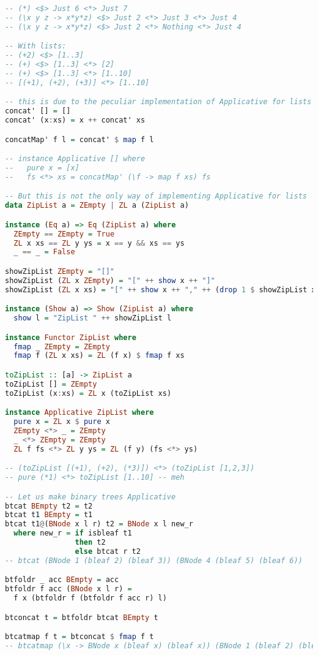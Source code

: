 \begin{lstlisting}[language=Haskell]
-- (*) <$> Just 6 <*> Just 7
-- (\x y z -> x*y*z) <$> Just 2 <*> Just 3 <*> Just 4
-- (\x y z -> x*y*z) <$> Just 2 <*> Nothing <*> Just 4

-- With lists:
-- (+2) <$> [1..3]
-- (+) <$> [1..3] <*> [2]
-- (+) <$> [1..3] <*> [1..10]
-- [(+1), (+2), (+3)] <*> [1..10]

-- this is due to the peculiar implementation of Applicative for lists
concat' [] = []
concat' (x:xs) = x ++ concat' xs

concatMap' f l = concat' $ map f l

-- instance Applicative [] where
--   pure x = [x]
--   fs <*> xs = concatMap' (\f -> map f xs) fs

-- But this is not the only way of implementing Applicative for lists
data ZipList a = ZEmpty | ZL a (ZipList a)

instance (Eq a) => Eq (ZipList a) where
  ZEmpty == ZEmpty = True
  ZL x xs == ZL y ys = x == y && xs == ys
  _ == _ = False

showZipList ZEmpty = "[]"
showZipList (ZL x ZEmpty) = "[" ++ show x ++ "]"
showZipList (ZL x xs) = "[" ++ show x ++ "," ++ (drop 1 $ showZipList xs)

instance (Show a) => Show (ZipList a) where
  show l = "ZipList " ++ showZipList l

instance Functor ZipList where
  fmap _ ZEmpty = ZEmpty
  fmap f (ZL x xs) = ZL (f x) $ fmap f xs

toZipList :: [a] -> ZipList a
toZipList [] = ZEmpty
toZipList (x:xs) = ZL x (toZipList xs)

instance Applicative ZipList where
  pure x = ZL x $ pure x
  ZEmpty <*> _ = ZEmpty
  _ <*> ZEmpty = ZEmpty
  ZL f fs <*> ZL y ys = ZL (f y) (fs <*> ys)

-- (toZipList [(+1), (+2), (*3)]) <*> (toZipList [1,2,3])
-- pure (*1) <*> toZipList [1..10] -- meh

-- Let us make binary trees Applicative
btcat BEmpty t2 = t2
btcat t1 BEmpty = t1
btcat t1@(BNode x l r) t2 = BNode x l new_r
  where new_r = if isbleaf t1
                then t2
                else btcat r t2
-- btcat (BNode 1 (bleaf 2) (bleaf 3)) (BNode 4 (bleaf 5) (bleaf 6))

btfoldr _ acc BEmpty = acc
btfoldr f acc (BNode x l r) =
  f x (btfoldr f (btfoldr f acc r) l)

btconcat t = btfoldr btcat BEmpty t

btcatmap f t = btconcat $ fmap f t
-- btcatmap (\x -> BNode x (bleaf x) (bleaf x)) (BNode 1 (bleaf 2) (bleaf 3))


\end{lstlisting}
